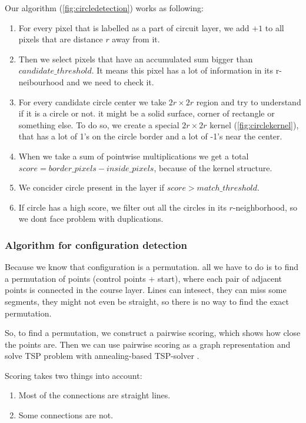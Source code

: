 \documentclass[a4paper,12pt]{extarticle}
\begin{document}
Our algorithm (\cref{fig:circledetection}) works as following:
\begin{enumerate}
    \item For every pixel that is labelled as a part of circuit layer, we add $+1$ to all pixels that are distance $r$ away from it.
    \item Then we select pixels that have an accumulated sum bigger than $candidate\_threshold$. It means this pixel has a lot of information in its r-neibourhood and we need to check it.
    \item For every candidate circle center we take $2r \times 2r$ region and try to understand if it is a circle or not. it might be a solid surface, corner of rectangle or something else. To do so, we create a special $2r \times 2r$ kernel (\cref{fig:circlekernel}), that has a lot of 1's on the circle border and a lot of -1's near the center.
    \item When we take a sum of pointwise multiplications we get a total $score = border\_pixels - inside\_pixels$, because of the kernel structure.
    \item We concider circle present in the layer if $score > match\_threshold$.
    \item If circle has a high score, we filter out all the circles in its $r$-neighborhood, so we dont face problem with duplications. 
\end{enumerate}

\subsubsection{Algorithm for configuration detection}

Because we know that configuration is a permutation. all we have to do is to find a permutation of points (control points + start), where each pair of adjacent points is connected in the course layer.
Lines can intesect, they can miss some segments, they might not even be straight, so there is no way to find the exact permutation.

So, to find a permutation, we construct a pairwise scoring, which shows how close the points are.
Then we can use pairwise scoring as a graph representation and solve TSP problem \cite{tsp} with annealing-based TSP-solver \cite{tspsolver}.

Scoring takes two things into account:
\begin{enumerate}
    \item Most of the connections are straight lines.
    \item Some connections are not.
\end{enumerate}
\end{document}
